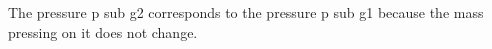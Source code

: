 The pressure p sub g2 corresponds to the pressure p sub g1 because the mass pressing on it does not change.